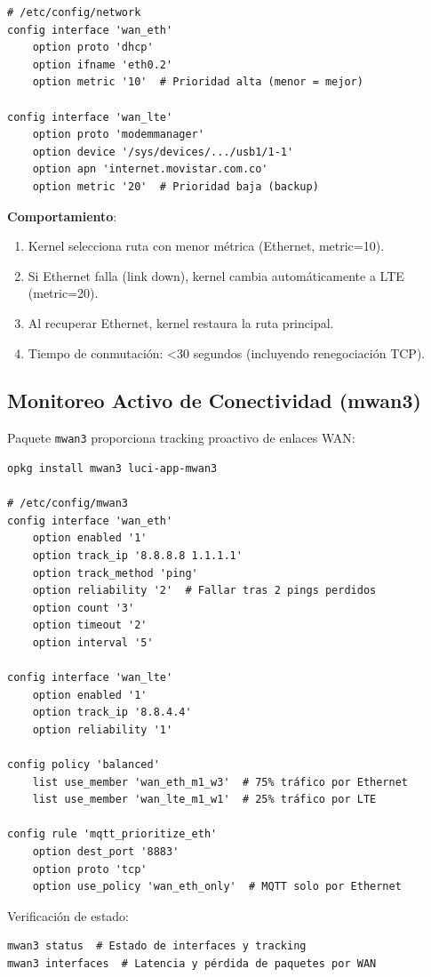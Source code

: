 \begin{verbatim}
# /etc/config/network
config interface 'wan_eth'
    option proto 'dhcp'
    option ifname 'eth0.2'
    option metric '10'  # Prioridad alta (menor = mejor)

config interface 'wan_lte'
    option proto 'modemmanager'
    option device '/sys/devices/.../usb1/1-1'
    option apn 'internet.movistar.com.co'
    option metric '20'  # Prioridad baja (backup)
\end{verbatim}

\textbf{Comportamiento}:
\begin{enumerate}
    \item Kernel selecciona ruta con menor métrica (Ethernet, metric=10).
    \item Si Ethernet falla (link down), kernel cambia automáticamente a LTE (metric=20).
    \item Al recuperar Ethernet, kernel restaura la ruta principal.
    \item Tiempo de conmutación: <30 segundos (incluyendo renegociación TCP).
\end{enumerate}

\subsection{Monitoreo Activo de Conectividad (mwan3)}

Paquete \texttt{mwan3} proporciona tracking proactivo de enlaces WAN:

\begin{verbatim}
opkg install mwan3 luci-app-mwan3

# /etc/config/mwan3
config interface 'wan_eth'
    option enabled '1'
    option track_ip '8.8.8.8 1.1.1.1'
    option track_method 'ping'
    option reliability '2'  # Fallar tras 2 pings perdidos
    option count '3'
    option timeout '2'
    option interval '5'

config interface 'wan_lte'
    option enabled '1'
    option track_ip '8.8.4.4'
    option reliability '1'

config policy 'balanced'
    list use_member 'wan_eth_m1_w3'  # 75% tráfico por Ethernet
    list use_member 'wan_lte_m1_w1'  # 25% tráfico por LTE

config rule 'mqtt_prioritize_eth'
    option dest_port '8883'
    option proto 'tcp'
    option use_policy 'wan_eth_only'  # MQTT solo por Ethernet
\end{verbatim}

Verificación de estado:
\begin{verbatim}
mwan3 status  # Estado de interfaces y tracking
mwan3 interfaces  # Latencia y pérdida de paquetes por WAN
\end{verbatim}

